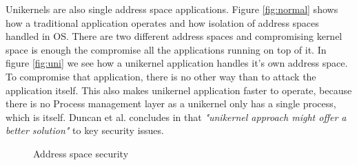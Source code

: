 Unikernels are also single address space applications. Figure \ref{fig:normal} shows how a traditional application operates and how isolation of address spaces handled in OS. There are two different address spaces and compromising kernel space is enough the compromise all the applications running on top of it. In figure \ref{fig:uni} we see how a unikernel application handles it's own address space. To compromise that application, there is no other way than to attack the application itself. This also makes unikernel application faster to operate, because there is no Process management layer as a unikernel only has a single process, which is itself. Duncan et al. concludes in \cite{Duncan2017} that \textit{"unikernel approach might offer a better solution"} to key security issues.
\begin{figure}[htbp]
    \centering
    \hfill
    \caption{Address space security}\label{fig:single-space}
  \end{figure}

